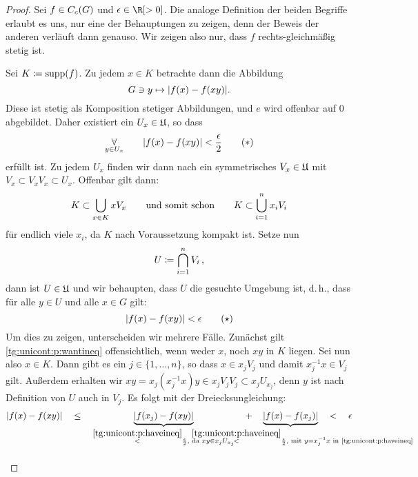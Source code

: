 \begin{proof}
    Sei $f\in C_c(G)$ und $\epsilon\in\R[>0]$.  Die analoge Definition der
    beiden Begriffe erlaubt es uns, nur eine der Behauptungen zu zeigen, denn
    der Beweis der anderen verläuft dann genauso.  Wir zeigen also nur, dass $f$
    rechts-gleichmäßig stetig ist.

    \noindent
    Sei $K\coloneqq\operatorname{supp}(f)$. Zu jedem $x\in K$ betrachte dann die Abbildung
    \[ G\ni y \mapsto \lvert f(x)-f(xy) \rvert .\]
    Diese ist stetig als Komposition stetiger Abbildungen, und $e$ wird offenbar
    auf $0$ abgebildet. Daher existiert ein $U_x\in\mathfrak{U}$, so dass
    \[  \operatorname*{\forall}_{y\in U_x}\qquad
        \lvert f(x)-f(xy)\rvert < \frac{\epsilon}{2}
        \tag{$\ast$}\label{tg:unicont:p:haveineq}
    \]    
    erfüllt ist. Zu jedem $U_x$ finden wir dann nach 
    ein symmetrisches $V_x\in\mathfrak{U}$ mit $V_x \subset V_x V_x \subset U_x$.
    Offenbar gilt dann:
    \[  K \subset \bigcup_{x\in K} xV_x \qquad\text{und somit schon}\qquad
        K \subset \bigcup_{i=1}^n  x_iV_i 
    \]
    für endlich viele $x_i$, da $K$ nach Voraussetzung kompakt ist.
    Setze nun
    \[ U \coloneqq \bigcap_{i=1}^n V_i \,, \]
    dann ist $U\in\mathfrak{U}$ und wir behaupten, dass $U$ die gesuchte Umgebung ist,
    d.\,h., dass für alle $y\in U$ und alle $x\in G$ gilt: 
    \[ \lvert f(x) - f(xy) \rvert < \epsilon  
        \tag{$\star$}\label{tg:unicont:p:wantineq}
    \]
    Um dies zu zeigen, unterscheiden wir mehrere Fälle. Zunächst gilt
    \eqref{tg:unicont:p:wantineq} offensichtlich, wenn weder $x$, noch $xy$ in $K$
    liegen. Sei nun also $x\in K$. Dann gibt es ein $j\in\{1,\ldots,n\}$, so
    dass $x\in x_jV_j$ und damit $x_j^{-1}x \in V_j$ gilt. Außerdem erhalten
    wir $xy = x_j(x_j^{-1}x)y \in x_jV_jV_j \subset x_jU_{x_j}$, denn $y$ ist
    nach Definition von $U$ auch in $V_j$. Es folgt mit der Dreiecksungleichung:
    \begin{align*}
        \abs{ f(x) - f(xy) } 
        \quad &\leq \quad
        \underbrace{ \abs{f(x_j) - f(xy)} }_{
            \overset{\eqref{tg:unicont:p:haveineq}}{<} \frac{\epsilon}{2},
            \text{ da } xy\in x_jU_{x_j} 
        }
        \quad + \quad
        \underbrace{ \abs{f(x) - f(x_j)} }_{ \hspace*{26pt} \mathclap{
            \overset{\eqref{tg:unicont:p:haveineq}}{<} \frac{\epsilon}{2},
            \text{ mit } y=x_j^{-1}x \text{ in \eqref{tg:unicont:p:haveineq}}  
        } }
        \quad < \quad \epsilon
    \\
    \intertext{%
}
\end{align*}
\end{proof}
